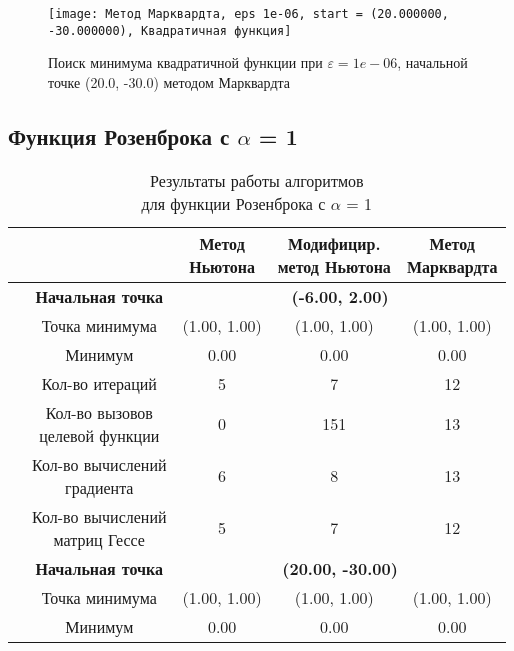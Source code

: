             \begin{figure}[H]
	        \centering
	        \texttt{[image: Метод Марквардта, eps 1e-06, start = (20.000000, -30.000000), Квадратичная функция]}%
	        \caption{Поиск минимума квадратичной функции при $\varepsilon = 1e-06$, начальной точке (20.0, -30.0) методом Марквардта}
	        \vspace*{-1.2cm}
            \end{figure}
            \subsection{Функция Розенброка с $\alpha$ = 1}

\begin{table}[H]
        \centering
        \vspace*{-1.5em}
        \caption{Результаты работы алгоритмов\\для функции Розенброка с $\alpha$ = 1}
        \footnotesize
        \begin{tabular}{|c|c|c|c|c|}
        \hline
        & &\makecell{Метод\\Ньютона} &\makecell{Модифицир.\\метод Ньютона} &\makecell{Метод\\Марквардта} \\
        \hline
	\multirow{12}{*}{\rotatebox[origin=c]{90}{$\varepsilon = 0.01$}}&\textbf{Начальная точка} &\multicolumn{3}{c|}{\textbf{(-6.00, 2.00)}}\\
	\cline{2-5}
	&Точка минимума &(1.00, 1.00) &(1.00, 1.00) &(1.00, 1.00) \\ 
	\cline{2-5}
	&Минимум &0.00 &0.00 &0.00 \\ 
	\cline{2-5}
	&Кол-во итераций &5 &7 &12 \\ 
	\cline{2-5}
	&\makecell{Кол-во вызовов\\целевой функции} &0 &151 &13 \\ 
	\cline{2-5}
	&\makecell{Кол-во вычислений\\градиента} &6 &8 &13 \\ 
	\cline{2-5}
	&\makecell{Кол-во вычислений\\матриц Гессе} &5 &7 &12 \\ 
	\cline{2-5}
\cline{2-5}&\textbf{Начальная точка} &\multicolumn{3}{c|}{\textbf{(20.00, -30.00)}}\\
	\cline{2-5}
	&Точка минимума &(1.00, 1.00) &(1.00, 1.00) &(1.00, 1.00) \\ 
	\cline{2-5}
	&Минимум &0.00 &0.00 &0.00 \\ 

\end{tabular}
\end{table}
